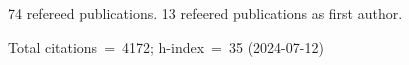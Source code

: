 74 refereed publications. 13 refeered publications as first author.

Total citations~=~4172; h-index~=~35 (2024-07-12)